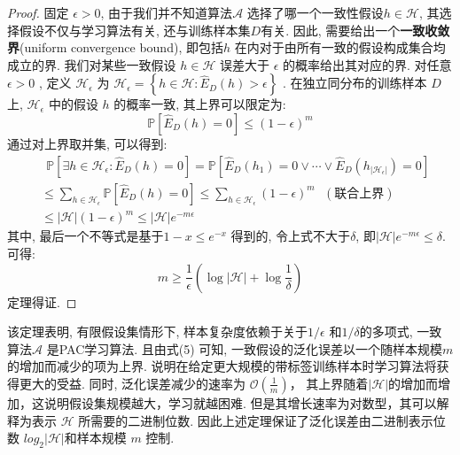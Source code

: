 \begin{proof}
固定 $\epsilon>0$, 由于我们并不知道算法$\mathcal{A}$ 选择了哪一个一致性假设$h\in \mathcal{H}$, 其选择假设不仅与学习算法有关, 还与训练样本集$D$有关. 因此, 需要给出一个\textbf{一致收敛界}(uniform convergence bound), 即包括$h$ 在内对于由所有一致的假设构成集合均成立的界. 我们对某些一致假设 $h\in \mathcal{H}$ 误差大于 $\epsilon $ 的概率给出其对应的界. 对任意 $\epsilon>0$ , 定义 $ \mathcal{H}_\epsilon$ 为  $ \mathcal{H}_\epsilon = \left\{h\in\mathcal{H}:\hat{E}_D(h)>\epsilon \right\} $ . 在独立同分布的训练样本 $D$ 上,  $\mathcal{H}_\epsilon$ 中的假设 $h$ 的概率一致, 其上界可以限定为: \\
\begin{equation}
\mathbb{P}\left[ \hat{E}_D\left( h \right) =0 \right] \le \left( 1-\epsilon \right) ^m \nonumber
\end{equation}
通过对上界取并集, 可以得到:
\begin{equation}
\begin{aligned}
&\ \ \mathbb{P}\left[ \exists h\in \mathcal{H}_{\epsilon}:\hat{E}_D\left( h \right) =0 \right] =\mathbb{P}\left[ \hat{E}_D\left( h_1 \right) =0\lor \cdots \lor \hat{E}_D\left( h_{\left| \mathcal{H}_{\epsilon} \right|} \right) =0 \right] \\
& \le \sum_{h\in \mathcal{H}_{\epsilon}}{\mathbb{P}\left[ \hat{E}_D\left( h \right) =0 \right]}\le \sum_{h\in \mathcal{H}_{\epsilon}}{\left( 1-\epsilon \right) ^m} \ \ \ (\text{联合上界}) \\
& \le \left| \mathcal{H} \right|\left( 1-\epsilon \right) ^m\le \left| \mathcal{H} \right|e^{-m\epsilon} \nonumber
\end{aligned}
\end{equation}
其中, 最后一个不等式是基于$1-x \le e^{-x}$ 得到的, 令上式不大于$\delta$, 即$\left| \mathcal{H} \right|e^{-m\epsilon}\le \delta$. 可得:
\begin{equation}
m\ge \frac{1}{\epsilon}\left( \log \left| \mathcal{H} \right|+\log \frac{1}{\delta} \right) \nonumber
\end{equation}
定理得证.
\end{proof}
\par
该定理表明, 有限假设集情形下, 样本复杂度依赖于关于$1/\epsilon$ 和$1/\delta$的多项式, 一致算法$\mathcal{A}$ 是PAC学习算法. 且由式(5) 可知, 一致假设的泛化误差以一个随样本规模$m$的增加而减少的项为上界. 说明在给定更大规模的带标签训练样本时学习算法将获得更大的受益. 同时, 泛化误差减少的速率为 $\mathcal{O}(\frac{1}{m})$， 其上界随着$|\mathcal{H}|$的增加而增加，这说明假设集规模越大，学习就越困难. 但是其增长速率为对数型，其可以解释为表示 $\mathcal{H}$ 所需要的二进制位数. 因此上述定理保证了泛化误差由二进制表示位数 $log_2|\mathcal{H}|$和样本规模 $m$ 控制.

